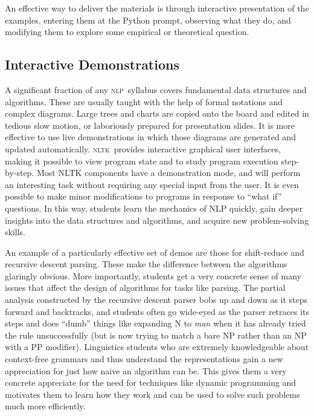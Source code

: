 \documentclass[11pt]{article}
\newcommand{\NLP}{\textsc{nlp}}
\newcommand{\NLTK}{\textsc{nltk}}
\begin{document}
An effective way to deliver the materials is through interactive
presentation of the examples, entering them at the Python prompt,
observing what they do, and modifying them to explore some empirical
or theoretical question.


\subsection{Interactive Demonstrations}

A significant fraction of any \NLP\ syllabus covers fundamental data
structures and algorithms. These are usually taught with the help of
formal notations and complex diagrams. Large trees and charts are
copied onto the board and edited in tedious slow motion, or
laboriously prepared for presentation slides. It is more effective to
use live demonstrations in which those diagrams are generated and
updated automatically. \NLTK\ provides interactive graphical user
interfaces, making it possible to view program state and to study
program execution step-by-step. Most NLTK components have a
demonstration mode, and will perform an interesting task without
requiring any special input from the user. It is even possible to make
minor modifications to programs in response to ``what if'' questions. In
this way, students learn the mechanics of NLP quickly, gain deeper
insights into the data structures and algorithms, and acquire new
problem-solving skills.

An example of a particularly effective set of demos are those for
shift-reduce and recursive descent parsing. These make the difference
between the algorithms glaringly obvious. More importantly, students
get a very concrete sense of many issues that affect the design of
algorithms for tasks like parsing. The partial analysis constructed by
the recursive descent parser bobs up and down as it steps forward and
backtracks, and students often go wide-eyed as the parser retraces its
steps and does ``dumb'' things like expanding N to {\it man} when it
has already tried the rule unsuccessfully (but is now trying to match
a bare NP rather than an NP with a PP modifier). Linguistics students
who are extremely knowledgeable about context-free grammars and thus
understand the representations gain a new appreciation for just how
naive an algorithm can be. This gives them a very concrete appreciate
for the need for techniques like dynamic programming and motivates
them to learn how they work and can be used to solve such problems
much more efficiently.
\end{document}
